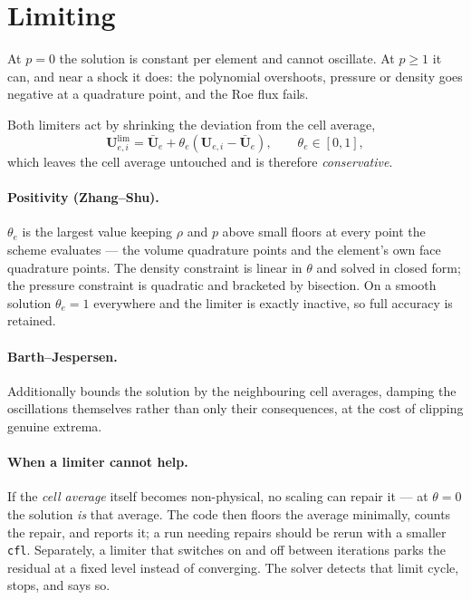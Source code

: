 \documentclass[11pt,a4paper]{article}
\newcommand{\vect}[1]{\boldsymbol{#1}}
\newcommand{\Uvec}{\vect{U}}
\newcommand{\code}[1]{\texttt{#1}}
\begin{document}
\section{Limiting}

At $p = 0$ the solution is constant per element and cannot oscillate.  At
$p \ge 1$ it can, and near a shock it does: the polynomial overshoots, pressure
or density goes negative at a quadrature point, and the Roe flux fails.

Both limiters act by shrinking the deviation from the cell average,
\begin{equation}
  \Uvec_{e,i}^{\mathrm{lim}} = \bar{\Uvec}_e
    + \theta_e \left(\Uvec_{e,i} - \bar{\Uvec}_e\right),
  \qquad \theta_e \in [0,1],
  \label{eq:limiter}
\end{equation}
which leaves the cell average untouched and is therefore \emph{conservative}.

\paragraph{Positivity (Zhang--Shu).}
$\theta_e$ is the largest value keeping $\rho$ and $p$ above small floors at
every point the scheme evaluates --- the volume quadrature points and the
element's own face quadrature points.  The density constraint is linear in
$\theta$ and solved in closed form; the pressure constraint is quadratic and
bracketed by bisection.  On a smooth solution $\theta_e = 1$ everywhere and the
limiter is exactly inactive, so full accuracy is retained.

\paragraph{Barth--Jespersen.}
Additionally bounds the solution by the neighbouring cell averages, damping the
oscillations themselves rather than only their consequences, at the cost of
clipping genuine extrema.

\paragraph{When a limiter cannot help.}
If the \emph{cell average} itself becomes non-physical, no scaling can repair it
--- at $\theta = 0$ the solution \emph{is} that average.  The code then floors
the average minimally, counts the repair, and reports it; a run needing repairs
should be rerun with a smaller \code{cfl}.  Separately, a limiter that switches
on and off between iterations parks the residual at a fixed level instead of
converging.  The solver detects that limit cycle, stops, and says so.
\end{document}
